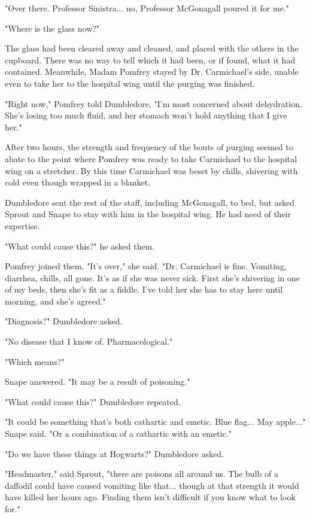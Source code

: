 "Over there. Professor Sinistra... no, Professor McGonagall poured it for me."

"Where is the glass now?"

The glass had been cleared away and cleaned, and placed with the others in the cupboard. There was no way to tell which it had been, or if found, what it had contained. Meanwhile, Madam Pomfrey stayed by Dr. Carmichael's side, unable even to take her to the hospital wing until the purging was finished.

"Right now," Pomfrey told Dumbledore, "I'm most concerned about dehydration. She's losing too much fluid, and her stomach won't hold anything that I give her."

After two hours, the strength and frequency of the bouts of purging seemed to abate to the point where Pomfrey was ready to take Carmichael to the hospital wing on a stretcher. By this time Carmichael was beset by chills, shivering with cold even though wrapped in a blanket.

Dumbledore sent the rest of the staff, including McGonagall, to bed, but asked Sprout and Snape to stay with him in the hospital wing. He had need of their expertise.

"What could cause this?" he asked them.

Pomfrey joined them. "It's over," she said. "Dr. Carmichael is fine. Vomiting, diarrhea, chills, all gone. It's as if she was never sick. First she's shivering in one of my beds, then she's fit as a fiddle. I've told her she has to stay here until morning, and she's agreed."

"Diagnosis?" Dumbledore asked.

"No disease that I know of. Pharmacological."

"Which means?"

Snape answered. "It may be a result of poisoning."

"What could cause this?" Dumbledore repeated.

"It could be something that's both cathartic and emetic. Blue flag... May apple..." Snape said. "Or a combination of a cathartic with an emetic."

"Do we have these things at Hogwarts?" Dumbledore asked.

"Headmaster," said Sprout, "there are poisons all around us. The bulb of a daffodil could have caused vomiting like that... though at that strength it would have killed her hours ago. Finding them isn't difficult if you know what to look for."

